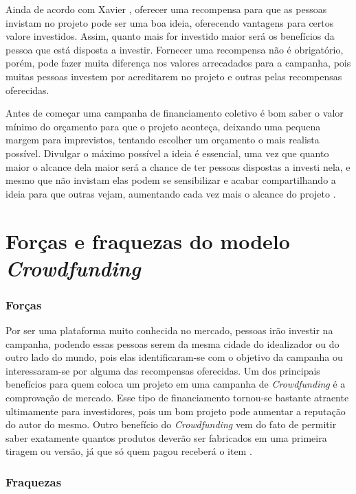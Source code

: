\documentclass{classe_cn}                 %
\begin{document}
Ainda de acordo com Xavier \cite{XAVIER:2016}, oferecer uma recompensa para que as pessoas invistam no projeto pode ser uma boa ideia, oferecendo vantagens para certos valore investidos. Assim, quanto mais for investido maior será os benefícios da pessoa que está disposta a investir. Fornecer uma recompensa não é obrigatório, porém, pode fazer muita diferença nos valores arrecadados para a campanha, pois muitas pessoas investem por acreditarem no projeto e outras pelas recompensas oferecidas.

Antes de começar uma campanha de financiamento coletivo é bom saber o valor mínimo do orçamento para que o projeto aconteça, deixando uma pequena margem para imprevistos, tentando escolher um orçamento o mais realista possível. Divulgar o máximo possível a ideia é essencial, uma vez que quanto maior o alcance dela maior será a chance de ter pessoas dispostas a investi nela, e mesmo que não invistam elas podem se sensibilizar e acabar compartilhando a ideia para que outras vejam, aumentando cada vez mais o alcance do projeto \cite{XAVIER:2016}.
\section{Forças e fraquezas do modelo \textit{Crowdfunding} }

\subsubsection{Forças}

Por ser uma plataforma muito conhecida no mercado, pessoas irão investir na campanha, podendo essas pessoas serem da mesma cidade do idealizador ou do outro lado do mundo, pois elas identificaram-se com o objetivo da campanha ou interessaram-se por alguma das recompensas oferecidas. Um dos principais benefícios para quem coloca um projeto em uma campanha de \textit{Crowdfunding}  é a comprovação de mercado. Esse tipo de financiamento tornou-se bastante atraente ultimamente para investidores, pois um bom projeto pode aumentar a reputação do autor do mesmo. Outro benefício do \textit{Crowdfunding}  vem do fato de permitir saber exatamente quantos produtos deverão ser fabricados em uma primeira tiragem ou versão, já que só quem pagou receberá o item \cite{PEREIRA:2016}.

\subsubsection{Fraquezas}
\end{document}
